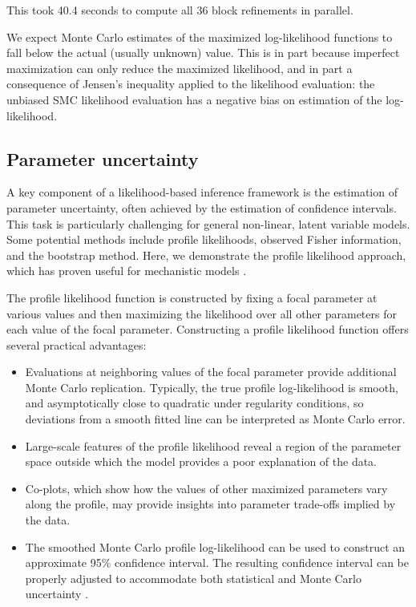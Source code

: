 \noindent This took 40.4 seconds to compute all 36 block refinements in parallel.

We expect Monte Carlo estimates of the maximized log-likelihood functions to fall below the actual (usually unknown) value.
This is in part because imperfect maximization can only reduce the maximized likelihood, and in part a consequence of Jensen's inequality applied to the likelihood evaluation: the unbiased SMC likelihood evaluation has a negative bias on estimation of the log-likelihood.

\subsection{Parameter uncertainty}\label{parameter-uncertainty}

A key component of a likelihood-based inference framework is the estimation of parameter uncertainty, often achieved by the estimation of confidence intervals.
This task is particularly challenging for general non-linear, latent variable models.
Some potential methods include profile likelihoods, observed Fisher information, and the bootstrap method.
Here, we demonstrate the profile likelihood approach, which has proven useful for mechanistic models \citep{simpson23}.

The profile likelihood function is constructed by fixing a focal parameter at various values and then maximizing the likelihood over all other parameters for each value of the focal parameter.
Constructing a profile likelihood function offers several practical advantages:

\begin{itemize}
\tightlist
\item
  Evaluations at neighboring values of the focal parameter provide additional Monte Carlo replication. Typically, the true profile log-likelihood is smooth, and asymptotically close to quadratic under regularity conditions, so deviations from a smooth fitted line can be interpreted as Monte Carlo error.
\item
  Large-scale features of the profile likelihood reveal a region of the parameter space outside which the model provides a poor explanation of the data.
\item
  Co-plots, which show how the values of other maximized parameters vary along the profile, may provide insights into parameter trade-offs implied by the data.
\item
  The smoothed Monte Carlo profile log-likelihood can be used to construct an approximate 95\% confidence interval. The resulting confidence interval can be properly adjusted to accommodate both statistical and Monte Carlo uncertainty \citep{ionides17}.
\end{itemize}


